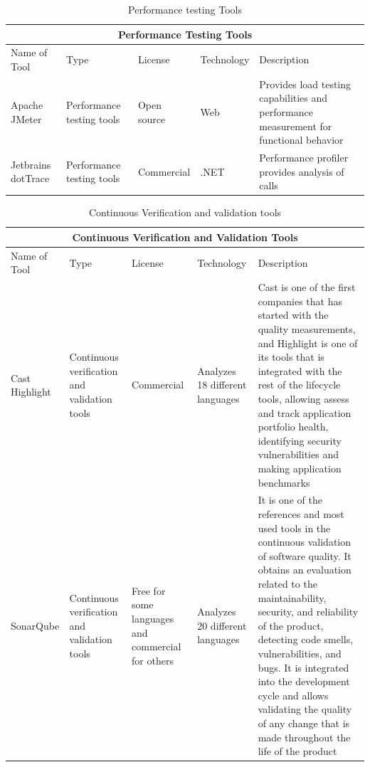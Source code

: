 \documentclass[journal, onecolumn]{IEEEtran}
\begin{document}
	
	\pagebreak 
	
	\begin{table}
		\centering
		\begin{tabular}{|p{1cm}||p{1.5cm}|p{1.5cm}|p{1.25cm}|p{3cm}|}
			\hline
			\multicolumn{5}{|c|}{Performance Testing Tools} \\
			\hline
			Name of Tool & Type & License & Technology &Description\\
			\hline
			Apache JMeter  & Performance testing tools  & Open source & Web & Provides load testing capabilities and performance measurement for functional behavior\\
			\hline
			Jetbrains dotTrace & Performance testing tools &  Commercial  & .NET & Performance profiler provides analysis of calls\\
			\hline
		\end{tabular}
		\caption{Performance testing Tools}
	\end{table}
	
	\pagebreak	
	\begin{table}[t]
		\centering
		\begin{tabular}{|p{1cm}||p{1.5cm}|p{1.5cm}|p{1.25cm}|p{3cm}|}
			\hline
			\multicolumn{5}{|c|}{Continuous Verification and Validation Tools} \\
			\hline
			Name of Tool & Type & License & Technology &Description\\
			\hline
			Cast Highlight  & Continuous verification and validation tools  & Commercial & Analyzes 18 different languages & Cast is one of the first companies that has started with the quality measurements, and Highlight is one of its tools that is integrated with the rest of the lifecycle tools, allowing assess and track application portfolio health, identifying security vulnerabilities and making application benchmarks\\
			\hline
			SonarQube & Continuous verification and validation tools &  Free for some languages and commercial for others  & Analyzes 20 different languages &It is one of the references and most used tools in the continuous validation of software quality. It obtains an evaluation related to the maintainability, security, and reliability of the product, detecting code smells, vulnerabilities, and bugs. It is integrated into the development cycle and allows validating the quality of any change that is made throughout the life of the product\\
			\hline
		\end{tabular}
		\caption{\label{tab:table-name}Continuous Verification and validation tools} 
	\end{table}
	
	\pagebreak
	
	
	
\end{document}
